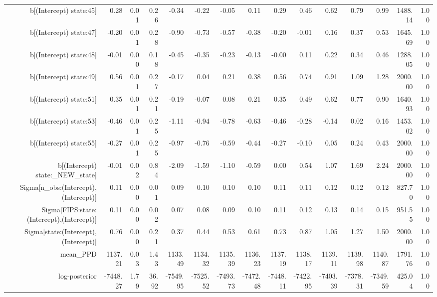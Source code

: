 \begin{table}[ht]
\begin{tabular}{rrrrrrrrrrrrrrr}
  b[(Intercept) state:45] & 0.28 & 0.01 & 0.26 & -0.34 & -0.22 & -0.05 & 0.11 & 0.29 & 0.46 & 0.62 & 0.79 & 0.99 & 1488.14 & 1.00 \\ 
  b[(Intercept) state:47] & -0.20 & 0.01 & 0.28 & -0.90 & -0.73 & -0.57 & -0.38 & -0.20 & -0.01 & 0.16 & 0.37 & 0.53 & 1645.69 & 1.00 \\ 
  b[(Intercept) state:48] & -0.01 & 0.00 & 0.18 & -0.45 & -0.35 & -0.23 & -0.13 & -0.00 & 0.11 & 0.22 & 0.34 & 0.46 & 1288.05 & 1.00 \\ 
  b[(Intercept) state:49] & 0.56 & 0.01 & 0.27 & -0.17 & 0.04 & 0.21 & 0.38 & 0.56 & 0.74 & 0.91 & 1.09 & 1.28 & 2000.00 & 1.00 \\ 
  b[(Intercept) state:51] & 0.35 & 0.01 & 0.21 & -0.19 & -0.07 & 0.08 & 0.21 & 0.35 & 0.49 & 0.62 & 0.77 & 0.90 & 1640.93 & 1.00 \\ 
  b[(Intercept) state:53] & -0.46 & 0.01 & 0.25 & -1.11 & -0.94 & -0.78 & -0.63 & -0.46 & -0.28 & -0.14 & 0.02 & 0.16 & 1453.02 & 1.00 \\ 
  b[(Intercept) state:55] & -0.27 & 0.01 & 0.25 & -0.97 & -0.76 & -0.59 & -0.44 & -0.27 & -0.10 & 0.05 & 0.24 & 0.43 & 2000.00 & 1.00 \\ 
  b[(Intercept) state:\_NEW\_state] & -0.01 & 0.02 & 0.84 & -2.09 & -1.59 & -1.10 & -0.59 & 0.00 & 0.54 & 1.07 & 1.69 & 2.24 & 2000.00 & 1.00 \\ 
  Sigma[n\_obs:(Intercept),(Intercept)] & 0.11 & 0.00 & 0.01 & 0.09 & 0.10 & 0.10 & 0.10 & 0.11 & 0.11 & 0.12 & 0.12 & 0.12 & 827.70 & 1.00 \\ 
  Sigma[FIPS:state:(Intercept),(Intercept)] & 0.11 & 0.00 & 0.02 & 0.07 & 0.08 & 0.09 & 0.10 & 0.11 & 0.12 & 0.13 & 0.14 & 0.15 & 951.55 & 1.00 \\ 
  Sigma[state:(Intercept),(Intercept)] & 0.76 & 0.00 & 0.21 & 0.37 & 0.44 & 0.53 & 0.61 & 0.73 & 0.87 & 1.05 & 1.27 & 1.50 & 2000.00 & 1.00 \\ 
  mean\_PPD & 1137.21 & 0.03 & 1.43 & 1133.49 & 1134.32 & 1135.39 & 1136.23 & 1137.19 & 1138.17 & 1139.11 & 1139.98 & 1140.87 & 1791.76 & 1.00 \\ 
  log-posterior & -7448.27 & 1.79 & 36.92 & -7549.95 & -7525.52 & -7493.73 & -7472.48 & -7448.11 & -7422.95 & -7403.39 & -7378.31 & -7349.59 & 425.04 & 1.00 \\ 
   \hline
\end{tabular}
\end{table}
